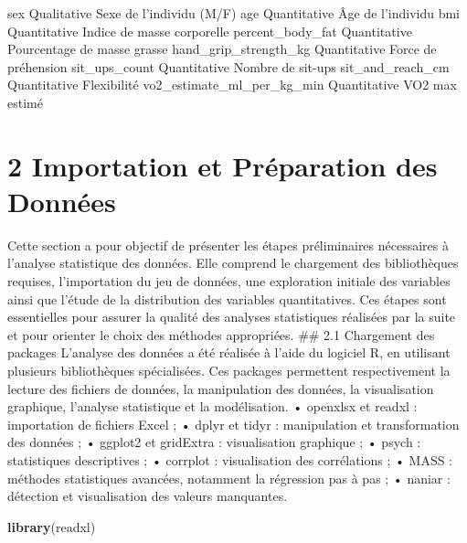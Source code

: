 \documentclass[
]{article}
\newenvironment{Shaded}{\begin{snugshade}}{\end{snugshade}}
\newcommand{\FunctionTok}[1]{\textcolor[rgb]{0.13,0.29,0.53}{\textbf{#1}}}
\newcommand{\NormalTok}[1]{#1}
\begin{document}
\textbar{} sex \textbar{} Qualitative \textbar{} Sexe de l'individu
(M/F) \textbar{} \textbar{} age \textbar{} Quantitative \textbar{} Âge
de l'individu \textbar{} \textbar{} bmi \textbar{} Quantitative
\textbar{} Indice de masse corporelle \textbar{} \textbar{}
percent\_body\_fat \textbar{} Quantitative \textbar{} Pourcentage de
masse grasse \textbar{} \textbar{} hand\_grip\_strength\_kg \textbar{}
Quantitative \textbar{} Force de préhension \textbar{} \textbar{}
sit\_ups\_count \textbar{} Quantitative \textbar{} Nombre de sit-ups
\textbar{} \textbar{} sit\_and\_reach\_cm \textbar{} Quantitative
\textbar{} Flexibilité \textbar{} \textbar{}
vo2\_estimate\_ml\_per\_kg\_min \textbar{} Quantitative \textbar{} VO2
max estimé \textbar{}

\section{2 Importation et Préparation des
Données}\label{importation-et-pruxe9paration-des-donnuxe9es}

Cette section a pour objectif de présenter les étapes préliminaires
nécessaires à l'analyse statistique des données. Elle comprend le
chargement des bibliothèques requises, l'importation du jeu de données,
une exploration initiale des variables ainsi que l'étude de la
distribution des variables quantitatives. Ces étapes sont essentielles
pour assurer la qualité des analyses statistiques réalisées par la suite
et pour orienter le choix des méthodes appropriées. \#\# 2.1 Chargement
des packages L'analyse des données a été réalisée à l'aide du logiciel
R, en utilisant plusieurs bibliothèques spécialisées. Ces packages
permettent respectivement la lecture des fichiers de données, la
manipulation des données, la visualisation graphique, l'analyse
statistique et la modélisation. • openxlsx et readxl : importation de
fichiers Excel ; • dplyr et tidyr : manipulation et transformation des
données ; • ggplot2 et gridExtra : visualisation graphique ; • psych :
statistiques descriptives ; • corrplot : visualisation des corrélations
; • MASS : méthodes statistiques avancées, notamment la régression pas à
pas ; • naniar : détection et visualisation des valeurs manquantes.

\begin{Shaded}
\begin{Highlighting}[]
\FunctionTok{library}\NormalTok{(readxl)}
\end{Highlighting}
\end{Shaded}
\end{document}
